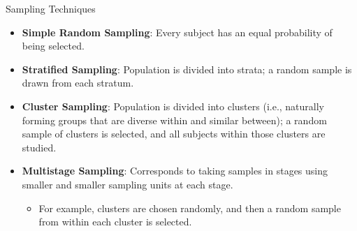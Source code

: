 \documentclass[handout]{beamer} %
\begin{document}
\begin{frame}{Sampling Techniques}
    \begin{itemize}
        \item \textbf{Simple Random Sampling}: Every subject has an equal probability of being selected. \pause %
        \item \textbf{Stratified Sampling}: Population is divided into strata; a random sample is drawn from each stratum. \pause %
        \item \textbf{Cluster Sampling}: Population is divided into clusters (i.e., naturally forming groups that are diverse within and similar between); a random sample of clusters is selected, and all subjects within those clusters are studied. \pause %
        \item \textbf{Multistage Sampling}: Corresponds to taking samples in stages using smaller and smaller sampling units at each stage. 
        \begin{itemize}
            \item For example, clusters are chosen randomly, and then a random sample from within each cluster is selected.
        \end{itemize}
    \end{itemize}
\end{frame}
\end{document}
